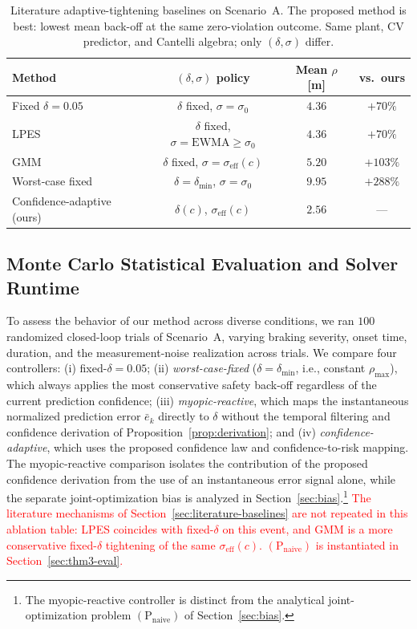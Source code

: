 \documentclass[letterpaper, 10 pt, conference]{ieeeconf}
\begin{document}
{\begin{table}[t]
\centering
\caption{Literature adaptive-tightening baselines on Scenario~A. The proposed method is best: lowest mean back-off at the same zero-violation outcome. Same plant, CV predictor, and Cantelli algebra; only $(\delta,\sigma)$ differ.}
\label{tab:literature}
\small
\setlength{\tabcolsep}{3.2pt}
\begin{tabular}{lccc}
\toprule
Method & $(\delta,\sigma)$ policy & Mean $\rho$ [m] & vs.\ ours \\
\midrule
Fixed $\delta=0.05$ & $\delta$ fixed, $\sigma=\sigma_0$ & $4.36$ & $+70\%$ \\
LPES \cite{ma2026sensor} & $\delta$ fixed, $\sigma=\mathrm{EWMA}\ge\sigma_0$ & $4.36$ & $+70\%$ \\
GMM \cite{engelaar2025stochastic} & $\delta$ fixed, $\sigma=\sigma_{\mathrm{eff}}(c)$ & $5.20$ & $+103\%$ \\
Worst-case fixed & $\delta=\delta_{\min}$, $\sigma=\sigma_0$ & $9.95$ & $+288\%$ \\
Confidence-adaptive (ours) & $\delta(c)$, $\sigma_{\mathrm{eff}}(c)$ & $2.56$ & --- \\
\bottomrule
\end{tabular}
\end{table}
}

\subsection{Monte Carlo Statistical Evaluation and Solver Runtime}
\label{sec:montecarlo}

To assess the behavior of our method across diverse conditions, we ran $100$ randomized closed-loop trials of Scenario~A, varying braking severity, onset time, duration, and the measurement-noise realization across trials. We compare four controllers: (i) fixed-$\delta=0.05$; (ii) \emph{worst-case-fixed} ($\delta=\delta_{\min}$, i.e., constant $\rho_{\max}$), which always applies the most conservative safety back-off regardless of the current prediction confidence; (iii) \emph{myopic-reactive}, which maps the instantaneous normalized prediction error $\bar e_k$ directly to $\delta$ without the temporal filtering and confidence derivation of Proposition~\ref{prop:derivation}; and (iv) \emph{confidence-adaptive}, which uses the proposed confidence law and confidence-to-risk mapping. The myopic-reactive comparison isolates the contribution of the proposed confidence derivation from the use of an instantaneous error signal alone, while the separate joint-optimization bias is analyzed in Section~\ref{sec:bias}.\footnote{The myopic-reactive controller is distinct from the analytical joint-optimization problem $(\mathrm P_{\mathrm{naive}})$ of Section~\ref{sec:bias}.} \textcolor{red}{The literature mechanisms of Section~\ref{sec:literature-baselines} are not repeated in this ablation table: LPES coincides with fixed-$\delta$ on this event, and GMM is a more conservative fixed-$\delta$ tightening of the same $\sigma_{\mathrm{eff}}(c)$. $(\mathrm P_{\mathrm{naive}})$ is instantiated in Section~\ref{sec:thm3-eval}.}
\end{document}
